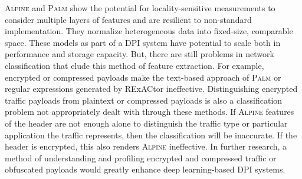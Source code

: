 \textsc{Alpine} and \textsc{Palm} show the potential for locality-sensitive measurements to consider multiple layers of features and are resilient to non-standard implementation. They normalize heterogeneous data into fixed-size, comparable space. These models as part of a DPI system have potential to scale both in performance and storage capacity. But, there are still problems in network classification that elude this method of feature extraction. For example, encrypted or compressed payloads make the text-based approach of \textsc{Palm} or regular expressions generated by RExACtor ineffective. Distinguishing encrypted traffic payloads from plaintext or compressed payloads is also a classification problem not appropriately dealt with through these methods. If \textsc{Alpine} features of the header are not enough alone to distinguish the traffic type or particular application the traffic represents, then the classification will be inaccurate. If the header is encrypted, this also renders \textsc{Alpine} ineffective. In further research, a method of understanding and profiling encrypted and compressed traffic or obfuscated payloads would greatly enhance deep learning-based DPI systems.
